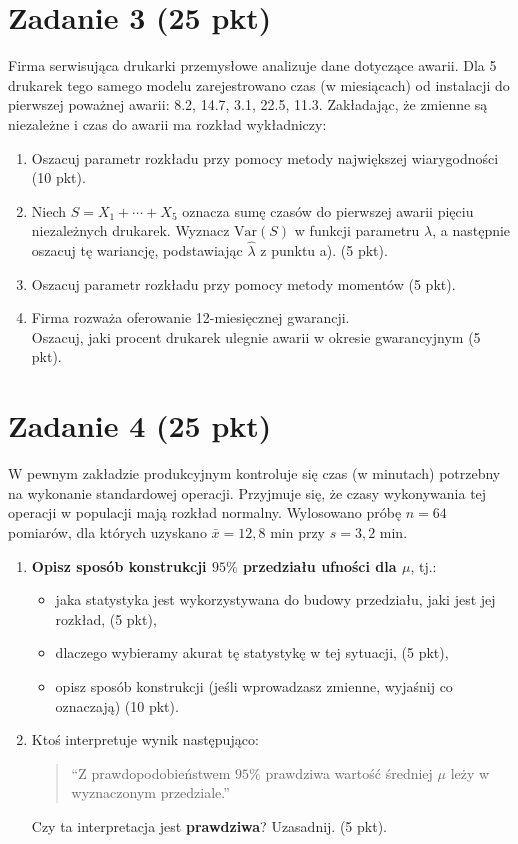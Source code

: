 \documentclass[polish, 10pt]{extarticle}
\begin{document}
\section*{Zadanie 3 (25 pkt)}
Firma serwisująca drukarki przemysłowe analizuje dane dotyczące awarii. Dla 5 drukarek tego samego modelu zarejestrowano czas (w miesiącach) od instalacji do pierwszej poważnej awarii: 8.2, 14.7, 3.1, 22.5, 11.3.
Zakładając, że zmienne są niezależne i czas do awarii ma rozkład wykładniczy:
\begin{enumerate}
    \item[a)] Oszacuj parametr rozkładu przy pomocy metody największej wiarygodności \hfill (10 pkt).
    \item[b)] Niech $S=X_1+\cdots+X_5$ oznacza sumę czasów do pierwszej awarii pięciu niezależnych drukarek. Wyznacz $\mathrm{Var}(S)$ w funkcji parametru $\lambda$, a następnie oszacuj tę wariancję, podstawiając $\hat{\lambda}$ z punktu a). \hfill (5 pkt).
    \item[c)] Oszacuj parametr rozkładu przy pomocy metody momentów \hfill (5 pkt).
    \item[d)] Firma rozważa oferowanie 12-miesięcznej gwarancji. \\Oszacuj, jaki procent drukarek ulegnie awarii w okresie gwarancyjnym \hfill (5 pkt).
\end{enumerate}

\section*{Zadanie 4 (25 pkt)}
W pewnym zakładzie produkcyjnym kontroluje się czas (w minutach) potrzebny na wykonanie standardowej operacji. Przyjmuje się, że czasy wykonywania tej operacji w populacji mają rozkład normalny. Wylosowano próbę \textbf{$n = 64$} pomiarów, dla których uzyskano $\bar{x} = 12{,}8$ min przy $s = 3{,}2$ min.

\begin{enumerate}
    \item \textbf{Opisz sposób konstrukcji $95\%$ przedziału ufności dla $\mu$}, tj.:
    \begin{itemize}
        \item jaka statystyka jest wykorzystywana do budowy przedziału, jaki jest jej rozkład, \hfill (5 pkt),
        \item dlaczego wybieramy akurat tę statystykę w tej sytuacji, \hfill (5 pkt),
        \item opisz sposób konstrukcji (jeśli wprowadzasz zmienne, wyjaśnij  co oznaczają) \hfill (10 pkt).
    \end{itemize}

    \item Ktoś interpretuje wynik następująco:
    \begin{quote}
    ``Z prawdopodobieństwem $95\%$ prawdziwa wartość średniej $\mu$ leży w wyznaczonym przedziale.''
    \end{quote}
    Czy ta interpretacja jest \textbf{prawdziwa}? Uzasadnij. \hfill (5 pkt).
\end{enumerate}
\end{document}
